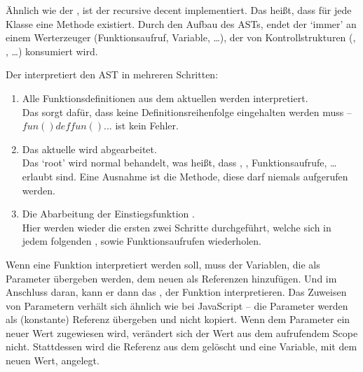 {      Ähnlich wie der , ist der  recursive decent implementiert. Das heißt, dass für jede  Klasse eine  Methode existiert. Durch den Aufbau des ASTs, endet der  `immer' an einem Werterzeuger (Funktionsaufruf, Variable, \ldots), der von Kontrollstrukturen (, , \ldots) konsumiert wird.

      Der  interpretiert den AST in mehreren Schritten:
      \begin{enumerate}
        \item Alle Funktionsdefinitionen aus dem aktuellen  werden interpretiert.\\
          Das sorgt dafür, dass keine Definitionsreihenfolge eingehalten werden muss -- \myMIn$fun() def fun() {...}$ ist kein Fehler.
        \item Das aktuelle  wird abgearbeitet.\\
          Das `root'  wird normal behandelt, was heißt, dass , , Funktionsaufrufe, \ldots{} erlaubt sind. Eine Ausnahme ist die  Methode, diese darf niemals aufgerufen werden.
        \item Die Abarbeitung der Einstiegsfunktion .\\
          Hier werden wieder die ersten zwei Schritte durchgeführt, welche sich in jedem folgenden , sowie Funktionsaufrufen wiederholen.
      \end{enumerate}

      Wenn eine Funktion interpretiert werden soll, muss der  Variablen, die als Parameter übergeben werden, dem neuen  als Referenzen hinzufügen. Und im Anschluss daran, kann er dann das , der Funktion interpretieren. Das Zuweisen von Parametern verhält sich ähnlich wie bei JavaScript -- die Parameter werden als (konstante) Referenz übergeben und nicht kopiert. Wenn dem Parameter ein neuer Wert zugewiesen wird, verändert sich der Wert aus dem aufrufendem Scope nicht. Stattdessen wird die Referenz aus dem  gelöscht und eine Variable, mit dem neuen Wert, angelegt.

}
